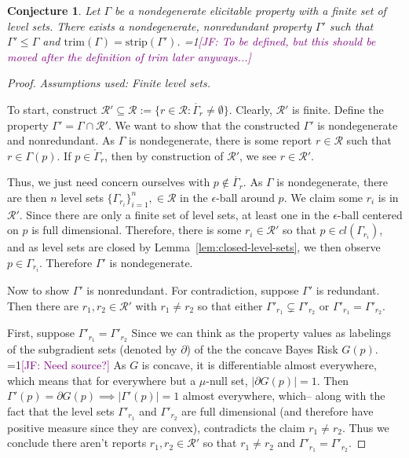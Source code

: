 \documentclass[12pt]{article}
\newcommand{\Comments}{1}
\newcommand{\mynote}[2]{\ifnum\Comments=1\textcolor{#1}{#2}\fi}
\newcommand{\jessie}[1]{\mynote{purple}{[JF: #1]}}
\newcommand{\R}{\mathcal{R}}
\newcommand{\inter}[1]{\mathring{#1}}%
\newcommand{\trim}{\mathrm{trim}}
\newcommand{\strip}{\text{strip}}
\newtheorem{conjecture}{Conjecture}
\begin{document}
\begin{conjecture}\label{conj:gam-prime-exists}
	Let $\Gamma$ be a nondegenerate elicitable property with a finite set of level sets.
	There exists a nondegenerate, nonredundant property $\Gamma'$ such that $\Gamma' \leq \Gamma$ and $\trim(\Gamma) = \strip(\Gamma')$. \jessie{To be defined, but this should be moved after the definition of trim later anyways...} 
\end{conjecture}
\begin{proof}
\emph{Assumptions used: Finite level sets.}

	To start, construct $\R' \subseteq \R := \{ r \in \R : \inter{\Gamma_r} \neq \emptyset \}$.
	Clearly, $\R'$ is finite.
	Define the property $\Gamma' = \Gamma\cap \R'$.
	We want to show that the constructed $\Gamma'$ is nondegenerate and nonredundant.
	As $\Gamma$ is nondegenerate, there is some report $r \in \R$ such that $r \in \Gamma(p)$.
	If $p \in \inter{\Gamma}_r$, then by construction of $\R'$, we see $r \in \R'$.
	
	Thus, we just need concern ourselves with $p \not \in \inter{\Gamma_r}$.
	As $\Gamma$ is nondegenerate, there are then $n$ level sets $\{\Gamma_{r_i}\}_{i=1}^n, \in \R$ in the $\epsilon$-ball around $p$.
	We claim some $r_i$ is in $\R'$.
	Since there are only a finite set of level sets, at least one in the $\epsilon$-ball centered on $p$ is full dimensional.
	Therefore, there is some $r_i \in \R'$ so that $p \in cl(\Gamma_{r_i})$, and as level sets are closed by Lemma~\ref{lem:closed-level-sets}, we then observe $p \in \Gamma_{r_i}$.
	Therefore $\Gamma'$ is nondegenerate.
	
	Now to show $\Gamma'$ is nonredundant.
	For contradiction, suppose $\Gamma'$ is redundant.
	Then there are $r_1, r_2 \in \R'$ with $r_1 \neq r_2$ so that either $\Gamma'_{r_1} \subsetneq \Gamma'_{r_2}$ or $\Gamma'_{r_1} = \Gamma'_{r_2}$.
	
	First, suppose $\Gamma'_{r_1} = \Gamma'_{r_2}$
	Since we can think as the property values as labelings of the subgradient sets (denoted by $\partial$) of the the concave Bayes Risk $G(p)$.
	\jessie{Need source?}
	As $G$ is concave, it is differentiable almost everywhere, which means that for everywhere but a $\mu$-null set, $|\partial G(p)| = 1$.
	Then $\Gamma'(p) = \partial G(p) \implies |\Gamma'(p)| = 1$ almost everywhere, which-- along with the fact that the level sets $\Gamma'_{r_1}$ and $\Gamma'_{r_2}$ are full dimensional (and therefore have positive measure since they are convex), contradicts the claim $r_1 \neq r_2$.
	Thus we conclude there aren't reports $r_1, r_2 \in \R'$ so that $r_1 \neq r_2$ and $\Gamma'_{r_1} = \Gamma'_{r_2}$.
	

\end{proof}
\end{document}
